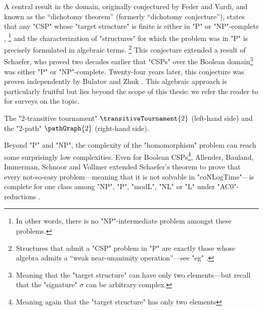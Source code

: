 A central result in the domain, originally conjectured by Feder and Vardi,
and known as the ``dichotomy theorem'' (formerly ``dichotomy conjecture''),
states that any "CSP" whose "target structure" is 
finite is either in "P" or "NP"-complete
\cite[\S~2, ``Dichotomy question'']{FederVardi1998ComputationalStructure},%
\footnote{In other words, there is no "NP"-intermediate 
problem amongst these problems.} and the characterization of "structures" for which the problem
was in "P" is precisely formulated in algebraic terms.%
\footnote{Structures that admit a "CSP" problem in "P" are exactly those whose algebra admits a
``weak near-unanimity operation''---see "eg" \cite[\S~1, p.~3]{Zhuk2020CSPDichotomy}.}
This conjecture extended a result of Schaefer, who proved two decades earlier
that "CSPs" over the Boolean domain\footnote{Meaning that the "target structure" can have only two elements---but recall that the "signature" $\sigma$ can be arbitrary complex.} was either "P" or "NP"-complete.
Twenty-four years later, this conjecture was proven independently by
Bulatov \cite[Theorem 1]{Bulatov2017DichotomyCSPs}
and Zhuk \cite[Theorem 1.4]{Zhuk2020CSPDichotomy}.
This algebraic approach is particularly fruitful but lies beyond
the scope of this thesis: we refer the reader to \cite{BartoKrokhinWillard2017Polymorphisms,Larose2017DigraphCSP} for surveys on the topic.

\begin{marginfigure}
	\centering
	\begin{tikzpicture}
		
	\end{tikzpicture}
	\hspace{4em}
	\begin{tikzpicture}
		
	\end{tikzpicture}
	\caption{
		\AP\label{fig:T2-P2}
		The "$2$-transitive tournament" $\transitiveTournament{2}$
		(left-hand side) and the "$2$-path" $\pathGraph{2}$ (right-hand side).
	}
\end{marginfigure}
Beyond "P" and "NP", the complexity of the "homomorphism" problem can reach some
surprisingly low complexities.
Even for Boolean CSPs\footnote{Meaning again that the "target structure" has only two elements},
Allender, Bauland, Immerman, Schnoor and Vollmer extended Schaefer's theorem to
prove that every not-so-easy problem---meaning that it is not solvable in "coNLogTime"---is
complete for one class among "NP", "P", "modL", "NL" or "L" under "AC0"-reductions
\cite[Theorem~3.1]{AllenderBaulandImmermanSchnoorVollmer2009Schaefer}.

